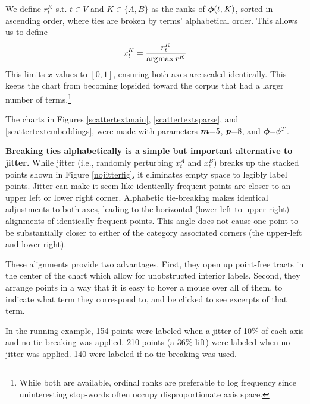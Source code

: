 \documentclass[11pt,a4paper]{article}
\begin{document}
We define $r^{K}_t$ s.t. $t \in V$ and $K \in \{A,B\}$ as the ranks of $\mbox{\boldmath$\phi$}(t,K)$, sorted in ascending order, where ties are broken by terms' alphabetical order.  This allows us to define \vspace{-.2cm}
\begin{equation}
\vspace{-.2cm}
x^{K}_t = \frac{r^{K}_t}{\arg\!\max r^{K}}
\end{equation}
This limits $x$ values to $[0,1]$, ensuring both axes are scaled identically.  This keeps the chart from becoming lopsided toward the corpus that had a larger number of terms.\footnote{While both are available, ordinal ranks are preferable to log frequency since uninteresting stop-words often occupy disproportionate axis space.} 

The charts in Figures \ref{scattertextmain}, \ref{scattertextsparse}, and \ref{scattertextembeddings}, were made with parameters $\mbox{\boldmath$m$}{=}5$, $\mbox{\boldmath$p$}{=}8$, and $\mbox{\boldmath$\phi$}{=}\phi^{T}$. 

\textbf{Breaking ties alphabetically is a simple but important alternative to jitter.} While jitter (i.e., randomly perturbing $x_{t}^{A}$ and $x_{t}^{B}$) breaks up the stacked points shown in Figure \ref{nojitterfig}, it eliminates empty space to legibly label points.  Jitter can make it seem like identically frequent points are closer to an upper left or lower right corner.  Alphabetic tie-breaking makes identical adjustments to both axes, leading to the horizontal (lower-left to upper-right) alignments of identically frequent points.  This angle does not cause one point to be substantially closer to either of the category associated corners (the upper-left and lower-right). 

These alignments provide two advantages. First, they open up point-free tracts in the center of the chart which allow for unobstructed interior labels. Second, they arrange points in a way that it is easy to hover a mouse over all of them, to indicate what term they correspond to, and be clicked to see excerpts of that term.

In the running example, 154 points were labeled when a jitter of 10\% of each axis and no tie-breaking was applied. 210 points (a 36\% lift) were labeled when no jitter was applied. 140 were labeled if no tie breaking was used.
\end{document}
